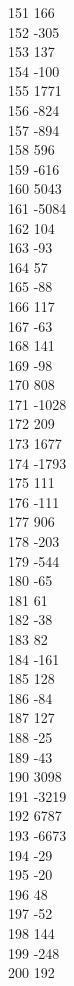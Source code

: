{ 151	166 \\
 152	-305 \\
 153	137 \\
 154	-100 \\
 155	1771 \\
 156	-824 \\
 157	-894 \\
 158	596 \\
 159	-616 \\
 160	5043 \\
 161	-5084 \\
 162	104 \\
 163	-93 \\
 164	57 \\
 165	-88 \\
 166	117 \\
 167	-63 \\
 168	141 \\
 169	-98 \\
 170	808 \\
 171	-1028 \\
 172	209 \\
 173	1677 \\
 174	-1793 \\
 175	111 \\
 176	-111 \\
 177	906 \\
 178	-203 \\
 179	-544 \\
 180	-65 \\
 181	61 \\
 182	-38 \\
 183	82 \\
 184	-161 \\
 185	128 \\
 186	-84 \\
 187	127 \\
 188	-25 \\
 189	-43 \\
 190	3098 \\
 191	-3219 \\
 192	6787 \\
 193	-6673 \\
 194	-29 \\
 195	-20 \\
 196	48 \\
 197	-52 \\
 198	144 \\
 199	-248 \\
 200	192 \\
}
